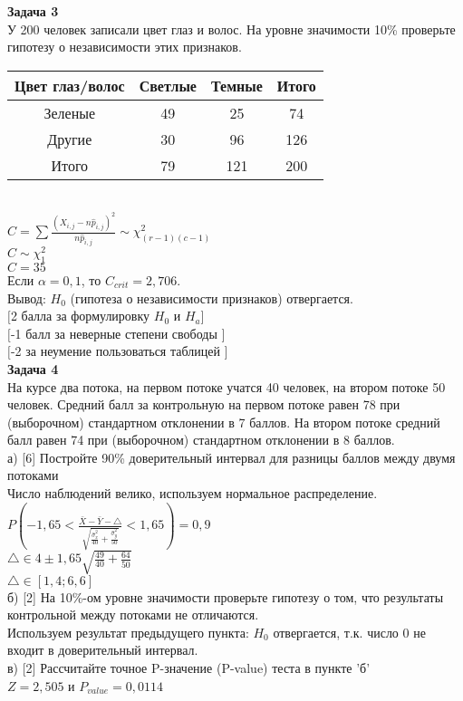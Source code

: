 \documentclass[pdftex,12pt,a4paper]{article}
\begin{document}
{\bf Задача 3} \\
У 200 человек записали цвет глаз и волос. На уровне значимости
10\% проверьте гипотезу о независимости этих признаков. \\
\begin{tabular}{|c|c|c|c|}
  \hline
  Цвет глаз/волос & Светлые & Темные & Итого \\
  \hline
  Зеленые & 49 & 25 & 74 \\
  Другие & 30 & 96 & 126 \\
  \hline
  Итого & 79 & 121 & 200 \\
  \hline
\end{tabular} \\
$C=\sum \frac{(X_{i,j}-n \hat{p}_{i,j})^{2}}{n\hat{p}_{i,j}}\sim
\chi_{(r-1)(c-1)}^{2}$ \\
$C\sim \chi_{1}^{2}$ \\
$C=35$ \\
Если $\alpha=0,1$, то $C_{crit}=2,706$. \\
Вывод: $H_{0}$ (гипотеза о независимости признаков) отвергается. \\
$[$2 балла за формулировку $H_{0}$ и $H_{a}]$ \\
$[$-1 балл за неверные степени свободы $]$ \\
$[$-2 за неумение пользоваться таблицей $]$ \\



{\bf Задача 4} \\
На курсе два потока, на первом потоке учатся 40 человек, на втором
потоке 50 человек. Средний балл за контрольную на первом потоке
равен 78 при (выборочном) стандартном отклонении в 7 баллов. На
втором потоке средний балл равен 74 при (выборочном) стандартном
отклонении в 8 баллов. \\
а) [6] Постройте 90\% доверительный интервал для разницы баллов
между
двумя потоками \\
Число наблюдений велико, используем нормальное распределение. \\
$P\left(-1,65<\frac{\bar{X}-\bar{Y}-\triangle}{\sqrt{\frac{\hat{\sigma}_{x}^{2}}{40}+\frac{\hat{\sigma}_{y}^{2}}{50}}}<1,65\right)=0,9$ \\
$\triangle \in 4 \pm 1,65\sqrt{\frac{49}{40}+\frac{64}{50}}$ \\
$\triangle \in [1,4;6,6]$ \\
 б) [2] На 10\%-ом уровне значимости проверьте
гипотезу о том, что
результаты контрольной между потоками не отличаются. \\
Используем результат предыдущего пункта: $H_{0}$ отвергается, т.к.
число 0 не входит в доверительный интервал. \\
в) [2] Рассчитайте точное P-значение (P-value) теста в пункте 'б' \\
$Z=2,505$ и $P_{value}=0,0114$ \\
\end{document}
